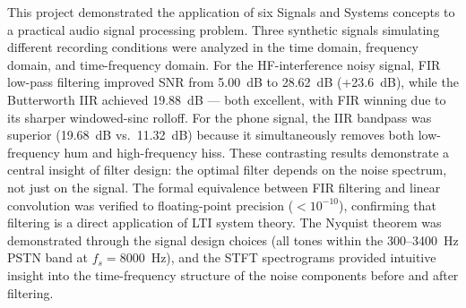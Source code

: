 \documentclass[journal]{IEEEtran}
\begin{document}
This project demonstrated the application of six Signals and Systems concepts
to a practical audio signal processing problem. Three synthetic signals simulating
different recording conditions were analyzed in the time domain, frequency domain,
and time-frequency domain. For the HF-interference noisy signal, FIR low-pass
filtering improved SNR from 5.00~dB to 28.62~dB (+23.6~dB), while the Butterworth
IIR achieved 19.88~dB — both excellent, with FIR winning due to its sharper
windowed-sinc rolloff. For the phone signal, the IIR bandpass was superior
(19.68~dB vs.\ 11.32~dB) because it simultaneously removes both low-frequency
hum and high-frequency hiss. These contrasting results demonstrate a central
insight of filter design: the optimal filter depends on the noise spectrum, not
just on the signal. The formal equivalence between FIR filtering and linear
convolution was verified to floating-point precision ($<10^{-10}$), confirming
that filtering is a direct application of LTI system theory. The Nyquist
theorem was demonstrated through the signal design choices (all tones within
the 300--3400~Hz PSTN band at $f_s = 8000$~Hz), and the STFT spectrograms
provided intuitive insight into the time-frequency structure of the noise
components before and after filtering.



\end{document}
